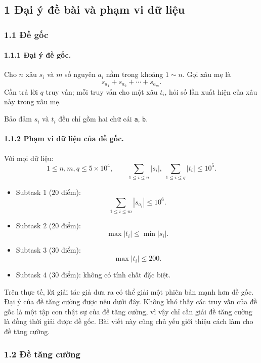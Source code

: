 \documentclass[11pt]{article}
\begin{document}
\subsection*{1 Đại ý đề bài và phạm vi dữ liệu}

\subsubsection*{1.1 Đề gốc}

\paragraph{1.1.1 Đại ý đề gốc.}
Cho \(n\) xâu \(s_i\) và \(m\) số nguyên \(a_i\) nằm trong khoảng \(1\sim n\).
Gọi xâu mẹ là
\[
  s_{a_1}+s_{a_2}+\cdots+s_{a_m}.
\]
Cần trả lời \(q\) truy vấn; mỗi truy vấn cho một xâu \(t_i\), hỏi số lần xuất
hiện của xâu này trong xâu mẹ.

Bảo đảm \(s_i\) và \(t_i\) đều chỉ gồm hai chữ cái \texttt{a}, \texttt{b}.

\paragraph{1.1.2 Phạm vi dữ liệu của đề gốc.}
Với mọi dữ liệu:
\[
  1\le n,m,q\le 5\times 10^4,\qquad
  \sum_{1\le i\le n}|s_i|,\ \sum_{1\le i\le q}|t_i|\le 10^5.
\]

\begin{itemize}
  \item Subtask 1 (\(20\) điểm):
  \[
    \sum_{1\le i\le m}|s_{a_i}|\le 10^6.
  \]
  \item Subtask 2 (\(20\) điểm):
  \[
    \max |t_i|\le \min |s_i|.
  \]
  \item Subtask 3 (\(30\) điểm):
  \[
    \max |t_i|\le 200.
  \]
  \item Subtask 4 (\(30\) điểm): không có tính chất đặc biệt.
\end{itemize}

Trên thực tế, lời giải tác giả đưa ra có thể giải một phiên bản mạnh hơn đề
gốc. Đại ý của đề tăng cường được nêu dưới đây. Không khó thấy các truy vấn của
đề gốc là một tập con thật sự của đề tăng cường, vì vậy chỉ cần giải đề tăng
cường là đồng thời giải được đề gốc. Bài viết này cũng chủ yếu giới thiệu cách
làm cho đề tăng cường.

\subsubsection*{1.2 Đề tăng cường}
\end{document}
